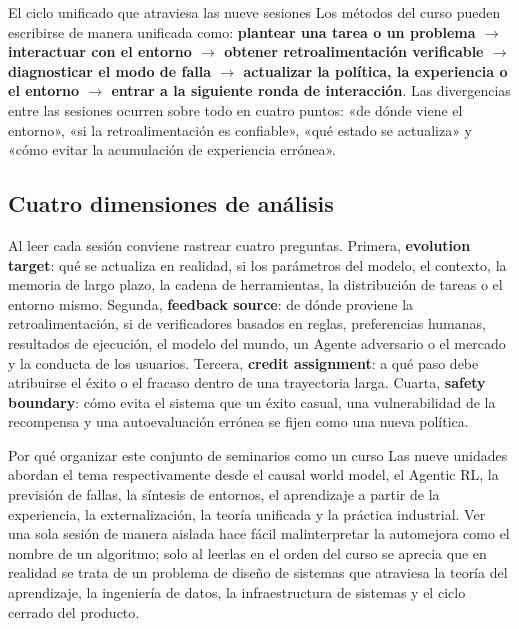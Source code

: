 \documentclass[a4paper]{article}
\begin{document}
\begin{importantbox}{El ciclo unificado que atraviesa las nueve sesiones}
Los métodos del curso pueden escribirse de manera unificada como: \textbf{plantear una tarea o un problema $\rightarrow$ interactuar con el entorno $\rightarrow$ obtener retroalimentación verificable $\rightarrow$ diagnosticar el modo de falla $\rightarrow$ actualizar la política, la experiencia o el entorno $\rightarrow$ entrar a la siguiente ronda de interacción}. Las divergencias entre las sesiones ocurren sobre todo en cuatro puntos: «de dónde viene el entorno», «si la retroalimentación es confiable», «qué estado se actualiza» y «cómo evitar la acumulación de experiencia errónea».
\end{importantbox}

\subsection{Cuatro dimensiones de análisis}

Al leer cada sesión conviene rastrear cuatro preguntas. Primera, \textbf{evolution target}: qué se actualiza en realidad, si los parámetros del modelo, el contexto, la memoria de largo plazo, la cadena de herramientas, la distribución de tareas o el entorno mismo. Segunda, \textbf{feedback source}: de dónde proviene la retroalimentación, si de verificadores basados en reglas, preferencias humanas, resultados de ejecución, el modelo del mundo, un Agente adversario o el mercado y la conducta de los usuarios. Tercera, \textbf{credit assignment}: a qué paso debe atribuirse el éxito o el fracaso dentro de una trayectoria larga. Cuarta, \textbf{safety boundary}: cómo evita el sistema que un éxito casual, una vulnerabilidad de la recompensa y una autoevaluación errónea se fijen como una nueva política.

\begin{knowledgebox}{Por qué organizar este conjunto de seminarios como un curso}
Las nueve unidades abordan el tema respectivamente desde el causal world model, el Agentic RL, la previsión de fallas, la síntesis de entornos, el aprendizaje a partir de la experiencia, la externalización, la teoría unificada y la práctica industrial. Ver una sola sesión de manera aislada hace fácil malinterpretar la automejora como el nombre de un algoritmo; solo al leerlas en el orden del curso se aprecia que en realidad se trata de un problema de diseño de sistemas que atraviesa la teoría del aprendizaje, la ingeniería de datos, la infraestructura de sistemas y el ciclo cerrado del producto.
\end{knowledgebox}
\end{document}
